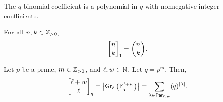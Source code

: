 \begin{corollary}
    The \(q\)-binomial coefficient is a polynomial in \(q\) with nonnegative integer coefficients.
\end{corollary}

\begin{corollary}
    For all \(n, k \in \mathbb{Z}_{> 0}\),
    \[
        \qbinom[1]{n}{k} = \binom{n}{k}.
    \]
\end{corollary}

\begin{lemma} \label{lem:grassmanian_qbinomial_prime_power}
    Let \(p\) be a prime, \(m \in \mathbb{Z}_{> 0}\), and \(\ell, w \in \mathbb{N}\).
    Let \(q = p^m\).
    Then,
    \[
        \qbinom{\ell + w}{\ell}
        = \left|
            \Grassmanian_\ell\left(\mathbb{F}_{q}^{\ell + w} \right)
        \right|
        = \sum_{\lambda \in \Par_{\ell, w}} (q)^{|\lambda|}.
    \]
\end{lemma}

